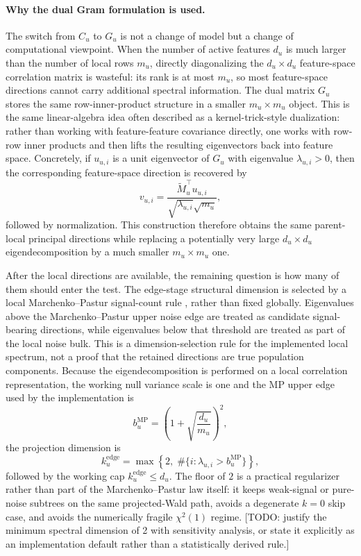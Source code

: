 \paragraph{Why the dual Gram formulation is used.}
The switch from $C_u$ to $G_u$ is not a change of model but a change of
computational viewpoint. When the number of active features $d_u$ is much
larger than the number of local rows $m_u$, directly diagonalizing the
$d_u \times d_u$ feature-space correlation matrix is wasteful: its rank is at
most $m_u$, so most feature-space directions cannot carry additional spectral
information. The dual matrix $G_u$ stores the same row-inner-product structure
in a smaller $m_u \times m_u$ object. This is the same linear-algebra idea
often described as a kernel-trick-style dualization: rather than working with
feature-feature covariance directly, one works with row-row inner products and
then lifts the resulting eigenvectors back into feature space. Concretely, if
$u_{u,i}$ is a unit eigenvector of $G_u$ with eigenvalue $\lambda_{u,i} > 0$,
then the corresponding feature-space direction is recovered by
\begin{equation}
v_{u,i} = \frac{\widetilde{M}_u^\top u_{u,i}}{\sqrt{\lambda_{u,i}}\sqrt{m_u}},
\end{equation}
followed by normalization. This construction therefore obtains the same
parent-local principal directions while replacing a potentially very large
$d_u \times d_u$ eigendecomposition by a much smaller $m_u \times m_u$ one.

After the local directions are available, the remaining question is how many of
them should enter the test. The edge-stage structural dimension is selected by a local
Marchenko--Pastur signal-count rule
\citep{marchenko1967distribution,johnstone2018pca}, rather than fixed
globally. Eigenvalues above the Marchenko--Pastur upper noise edge are treated
as candidate signal-bearing directions, while eigenvalues below that threshold
are treated as part of the local noise bulk. This is a dimension-selection rule
for the implemented local spectrum, not a proof that the retained directions
are true population components. Because the eigendecomposition is performed on
a local correlation representation, the working null variance scale is one and
the MP upper edge used by the implementation is
\begin{equation}
b_u^{\mathrm{MP}} =
\left(1 + \sqrt{\frac{d_u}{m_u}}\right)^2,
\end{equation}
the projection dimension is
\begin{equation}
k_u^{\mathrm{edge}}
=
\max\left\{
2,\;
\#\{i : \lambda_{u,i} > b_u^{\mathrm{MP}}\}
\right\},
\end{equation}
followed by the working cap $k_u^{\mathrm{edge}} \le d_u$. The floor of
$2$ is a practical regularizer rather than part of the
Marchenko--Pastur law itself: it keeps weak-signal or pure-noise subtrees on
the same projected-Wald path, avoids a degenerate $k=0$ skip case, and avoids
the numerically fragile $\chi^2(1)$ regime.
[TODO: justify the minimum spectral dimension of 2 with sensitivity analysis,
or state it explicitly as an implementation default rather than a statistically
derived rule.]

